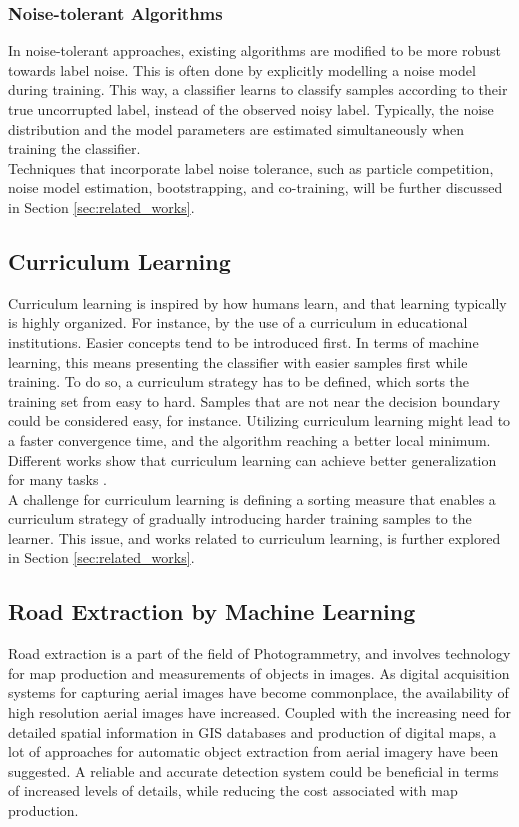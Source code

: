 \subsubsection{Noise-tolerant Algorithms}
In noise-tolerant approaches, existing algorithms are modified to be more robust towards label noise. This is often done by explicitly modelling a noise model during training. This way, a classifier learns to classify samples according to their true uncorrupted label, instead of the observed noisy label. Typically, the noise distribution and the model parameters are estimated simultaneously when training the classifier. \\

Techniques that incorporate label noise tolerance, such as particle competition, noise model estimation, bootstrapping, and co-training, will be further discussed in Section \ref{sec:related_works}.

\subsection{Curriculum Learning}
Curriculum learning is inspired by how humans learn, and that learning typically is highly organized. For instance, by the use of a curriculum in educational institutions. Easier concepts tend to be introduced first. In terms of machine learning, this means presenting the classifier with easier samples first while training. To do so, a curriculum strategy has to be defined, which sorts the training set from easy to hard. Samples that are not near the decision boundary could be considered easy, for instance. Utilizing curriculum learning might lead to a faster convergence time, and the algorithm reaching a better local minimum. Different works show that curriculum learning can achieve better generalization for many tasks \citep{Bengio_curriculumlearning} \citep{Kumar_self_paced_learning} \citep{Lu_self-paced_learning_diversity}.\\

A challenge for curriculum learning is defining a sorting measure that enables a curriculum strategy of gradually introducing harder training samples to the learner. This issue, and works related to curriculum learning, is further explored in Section \ref{sec:related_works}.\\

\subsection{Road Extraction by Machine Learning}
Road extraction is a part of the field of Photogrammetry, and involves technology for map production and measurements of objects in images. As digital acquisition systems for capturing aerial images have become commonplace, the availability of high resolution aerial images have increased. Coupled with the increasing need for detailed spatial information in \ac{GIS} databases and production of digital maps, a lot of approaches for automatic object extraction from aerial imagery have been suggested. A reliable and accurate detection system could be beneficial in terms of increased levels of details, while reducing the cost associated with map production.\\

